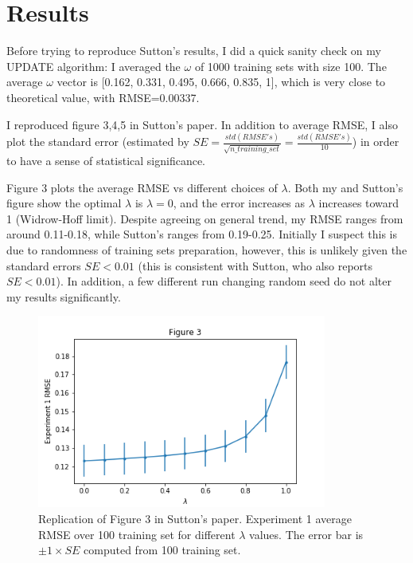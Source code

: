 \documentclass[conference]{IEEEtran}
\begin{document}
	\section{Results}
	Before trying to reproduce Sutton's results, I did a quick sanity check on my UPDATE algorithm: I averaged the $\omega$ of 1000 training sets with size 100. The average $\omega$ vector is [0.162, 0.331, 0.495, 0.666, 0.835, 1], which is very close to theoretical value, with RMSE=0.00337.
	
	I reproduced figure 3,4,5 in Sutton's paper. In addition to average RMSE, I also plot the standard error (estimated by $SE=\frac{std(RMSE's)}{\sqrt{n\_training\_set}}=\frac{std(RMSE's)}{10}$) in order to have a sense of statistical significance. 
	
	Figure 3 plots the average RMSE vs different choices of $\lambda$. Both my and Sutton's figure show the optimal $\lambda$ is $\lambda=0$, and the error increases as $\lambda$ increases toward 1 (Widrow-Hoff limit). Despite agreeing on general trend, my RMSE ranges from around 0.11-0.18, while Sutton's ranges from 0.19-0.25. Initially I suspect this is due to randomness of training sets preparation, however, this is unlikely given the standard errors $SE<0.01$ (this is consistent with Sutton, who also reports $SE<0.01$). In addition, a few different run changing random seed do not alter my results significantly.
	
	\begin{figure}
		\includegraphics[height=2.5in]{figure3.png} 
		\caption{Replication of Figure 3 in Sutton's paper. Experiment 1 average RMSE over 100 training set for different $\lambda$ values. The error bar is $\pm 1\times SE$ computed from 100 training set.}
		\label{fig:3}
	\end{figure}
	
\end{document}
